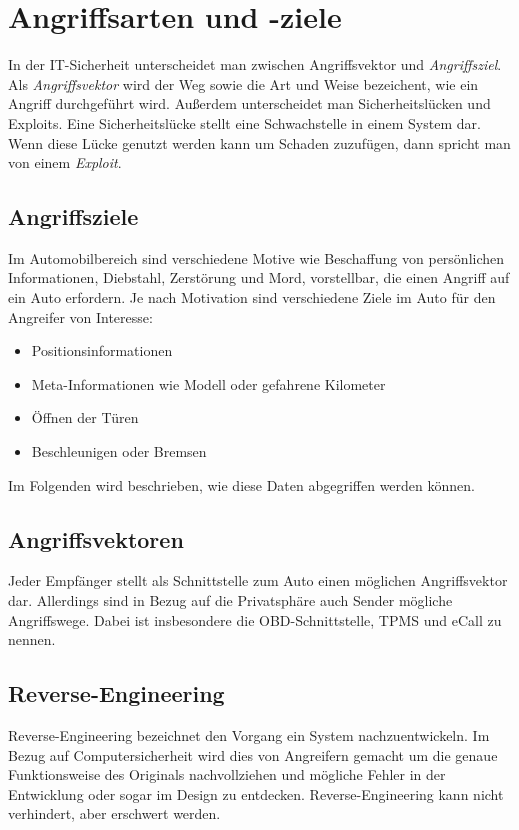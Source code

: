 \section{Angriffsarten und -ziele}

In der IT-Sicherheit unterscheidet man zwischen Angriffsvektor und
\textit{Angriffsziel}. Als \textit{Angriffsvektor} wird der Weg sowie die Art
und Weise bezeichent, wie ein Angriff durchgeführt wird\cite{Sambleben2012,Metasploit2012}.
Außerdem unterscheidet man Sicherheitslücken und Exploits. Eine
Sicherheitslücke stellt eine Schwachstelle in einem System dar. Wenn diese
Lücke genutzt werden kann um Schaden zuzufügen, dann spricht man von einem
\textit{Exploit}.


\subsection{Angriffsziele}
Im Automobilbereich sind verschiedene Motive wie Beschaffung von persönlichen
Informationen, Diebstahl, Zerstörung und Mord, vorstellbar, die einen Angriff
auf ein Auto erfordern. Je nach Motivation sind verschiedene Ziele im Auto für
den Angreifer von Interesse:

\begin{itemize}
    \item Positionsinformationen
    \item Meta-Informationen wie Modell oder gefahrene Kilometer
    \item Öffnen der Türen
    \item Beschleunigen oder Bremsen
\end{itemize}

Im Folgenden wird beschrieben, wie diese Daten abgegriffen werden können.


\subsection{Angriffsvektoren}
Jeder Empfänger stellt als Schnittstelle zum Auto einen möglichen
Angriffsvektor dar. Allerdings sind in Bezug auf die Privatsphäre auch Sender
mögliche Angriffswege. Dabei ist insbesondere die OBD-Schnittstelle, TPMS und
eCall zu nennen.

\subsection{Reverse-Engineering}
Reverse-Engineering bezeichnet den Vorgang ein System nachzuentwickeln. Im
Bezug auf Computersicherheit wird dies von Angreifern gemacht um die genaue
Funktionsweise des Originals nachvollziehen und mögliche Fehler in der
Entwicklung oder sogar im Design zu entdecken. Reverse-Engineering kann nicht
verhindert, aber erschwert werden.

